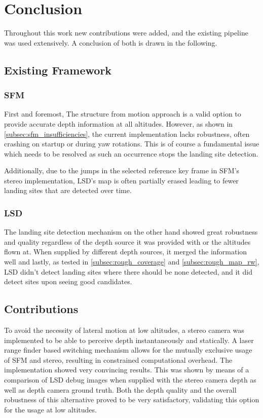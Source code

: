 \chapter{Conclusion}
\label{sec:conclusion}

Throughout this work new contributions were added, and the existing pipeline was used extensively. A conclusion of both is drawn in the following.

\section{Existing Framework}

\subsection{SFM}
First and foremost, The structure from motion approach is a valid option to provide accurate depth information at all altitudes. However, as shown in \cref{subsec:sfm_insufficiencies}, the current implementation lacks robustness, often crashing on startup or during yaw rotations. This is of course a fundamental issue which needs to be resolved as such an occurrence stops the landing site detection.

Additionally, due to the jumps in the selected reference key frame in SFM's stereo implementation, LSD's map is often partially erased leading to fewer landing sites that are detected over time.

\subsection{LSD}
The landing site detection mechanism on the other hand showed great robustness and quality regardless of the depth source it was provided with or the altitudes flown at. When supplied by different depth sources, it merged the information well and lastly, as tested in \cref{subsec:rough_coverage} and \cref{subsec:rough_map_rw}, LSD didn't detect landing sites where there should be none detected, and it did detect sites upon seeing good candidates.



\section{Contributions}

To avoid the necessity of lateral motion at low altitudes, a stereo camera was implemented to be able to perceive depth instantaneously and statically. A laser range finder based switching mechanism allows for the mutually exclusive usage of SFM and stereo, resulting in constrained computational overhead. The implementation showed very convincing results. This was shown by means of a comparison of LSD debug images when supplied with the stereo camera depth as well as depth camera ground truth. Both the depth quality and the overall robustness of this alternative proved to be very satisfactory, validating this option for the usage at low altitudes.

